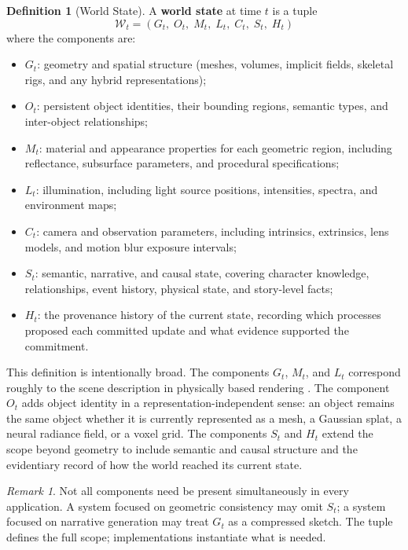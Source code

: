 \documentclass[12pt,a4paper]{article}
\theoremstyle{plain}
\theoremstyle{definition}
\newtheorem{definition}[theorem]{Definition}
\theoremstyle{remark}
\newtheorem{remark}[theorem]{Remark}
\begin{document}
\begin{definition}[World State]
A \textbf{world state} at time $t$ is a tuple
\[
\mathcal{W}_t = (G_t,\; O_t,\; M_t,\; L_t,\; C_t,\; S_t,\; H_t)
\]
where the components are:
\begin{itemize}[leftmargin=2em,itemsep=0pt]
\item $G_t$: geometry and spatial structure (meshes, volumes, implicit fields, skeletal rigs, and any hybrid representations);
\item $O_t$: persistent object identities, their bounding regions, semantic types, and inter-object relationships;
\item $M_t$: material and appearance properties for each geometric region, including reflectance, subsurface parameters, and procedural specifications;
\item $L_t$: illumination, including light source positions, intensities, spectra, and environment maps;
\item $C_t$: camera and observation parameters, including intrinsics, extrinsics, lens models, and motion blur exposure intervals;
\item $S_t$: semantic, narrative, and causal state, covering character knowledge, relationships, event history, physical state, and story-level facts;
\item $H_t$: the provenance history of the current state, recording which processes proposed each committed update and what evidence supported the commitment.
\end{itemize}
\end{definition}

This definition is intentionally broad. The components $G_t$, $M_t$, and $L_t$ correspond roughly to the scene description in physically based rendering \cite{pharr2023pbr}. The component $O_t$ adds object identity in a representation-independent sense: an object remains the same object whether it is currently represented as a mesh, a Gaussian splat, a neural radiance field, or a voxel grid. The components $S_t$ and $H_t$ extend the scope beyond geometry to include semantic and causal structure and the evidentiary record of how the world reached its current state.

\begin{remark}
Not all components need be present simultaneously in every application. A system focused on geometric consistency may omit $S_t$; a system focused on narrative generation may treat $G_t$ as a compressed sketch. The tuple defines the full scope; implementations instantiate what is needed.
\end{remark}
\end{document}
